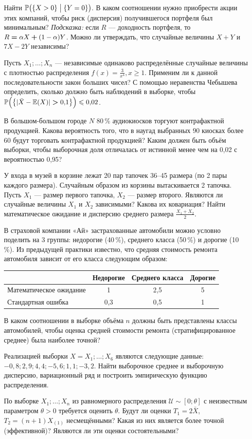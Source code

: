 \documentclass[12pt, a4paper]{article}\usepackage[]{graphicx}\usepackage[]{color}
\newenvironment{enumerate*}{
	\begin{enumerate}
		\setlength{\itemsep}{0pt}
		\setlength{\parskip}{0pt}
		\setlength{\parsep}{0pt}
	}{\end{enumerate}}
\begin{document}
\begin{enumerate*}
		Найти $\P\bigl( \{X>0\} \bigm| \{Y=0\}\bigr)$. В каком соотношении нужно приобрести акции этих компаний, чтобы риск (дисперсия) получившегося портфеля был минимальным? \emph{Подсказка:} если $R$ — доходность портфеля, то $R\hm=\alpha X\hm+(1-\alpha)Y$. Можно ли утверждать, что случайные величины $X+Y$ и $7X-2Y$ независимы?
		\item Пусть $X_1;\ldots;X_n$ — независимые одинаково распределённые случайные величины с плотностью распределения $f(x)=\frac{3}{x^4}, x\geqslant 1$. Применим ли к данной последовательности закон больших чисел? С помощью неравенства Чебышева определить, сколько должно быть наблюдений в выборке, чтобы $\P\Bigl( \big\{ |\bar X -\E(X)|\hm>0{,}1\big\} \Big)\leqslant 0{,}02$.
		\item В большом-большом городе $N$ 80\,\% аудиокиосков торгуют контрафактной продукцией. Какова вероятность того, что  в наугад выбранных 90 киосках более 60 будут торговать контрафактной  продукцией? Каким должен быть объём выборки, чтобы выборочная доля отличалась от истинной менее чем на 0{,}02 с вероятностью 0{,}95?
		\item У входа в музей в корзине лежат 20 пар тапочек 36--45 размера (по 2 пары каждого размера). Случайным образом из корзины вытаскивается 2 тапочка. Пусть $X_1$ — размер первого тапочка, $X_2$ — размер второго. Являются ли случайные величины $X_1$ и $X_2$ зависимыми? Какова их ковариация? Найти математическое ожидание и дисперсию среднего размера $\frac{X_1+X_2}{2}$.
		\item В страховой компании «Ай» застрахованные автомобили можно условно поделить на 3 группы: недорогие (40\,\%), среднего класса (50\,\%) и дорогие (10\,\%). Из предыдущей практики известно, что средняя стоимость ремонта автомобиля зависит от его класса следующим образом:
		\begin{center}
			\begin{tabular}{|l|c|c|c|}
				\hline
				& Недорогие & Среднего класса & Дорогие \\ \hline
				Математическое ожидание & 1 & 2{,}5 & 5 \\ \hline
				Стандартная ошибка & 0{,}3 & 0{,}5 & 1 \\ \hline
			\end{tabular}
		\end{center}
		В каком соотношении в выборке объёма $n$ должны быть представлены классы автомобилей, чтобы оценка средней стоимости ремонта (стратифицированное среднее) была наиболее точной?
		\item Реализацией выборки $X=X_1;\ldots;X_6$ являются следующие данные: $-0{,}8;2{,}9;4{,}4;-5{,}6;1{,}1;-3{,}2$. Найти выборочное среднее и выборочную дисперсию, вариационный ряд и построить эмпирическую функцию распределения.
		\item По выборке $X_1;\ldots;X_n$ из равномерного распределения $\mathcal{U}\sim[0;\theta]$ с неизвестным параметром $\theta >0$ требуется оценить $\theta$. Будут ли оценки $T_1=2\bar{X}$, $T_2=(n+1)X_{(1)}$ несмещёнными? Какая из них является более точной (эффективной)? Являются ли эти оценки состоятельными?
	\end{enumerate*}
\end{document}
